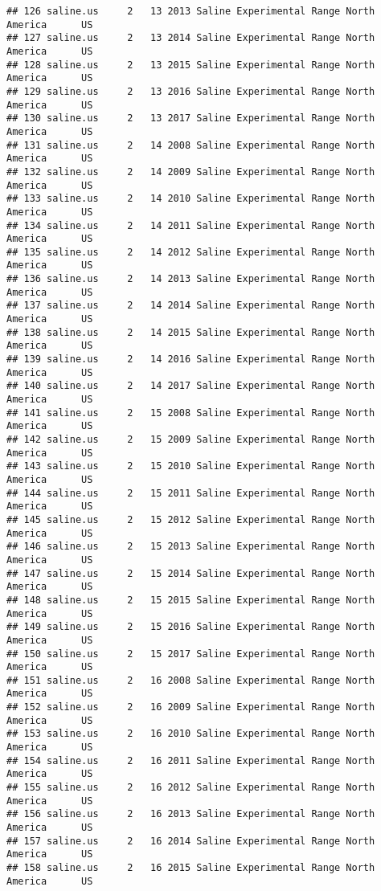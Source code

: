 \documentclass[]{article}
\begin{document}
\begin{verbatim}
## 126 saline.us     2   13 2013 Saline Experimental Range North America      US
## 127 saline.us     2   13 2014 Saline Experimental Range North America      US
## 128 saline.us     2   13 2015 Saline Experimental Range North America      US
## 129 saline.us     2   13 2016 Saline Experimental Range North America      US
## 130 saline.us     2   13 2017 Saline Experimental Range North America      US
## 131 saline.us     2   14 2008 Saline Experimental Range North America      US
## 132 saline.us     2   14 2009 Saline Experimental Range North America      US
## 133 saline.us     2   14 2010 Saline Experimental Range North America      US
## 134 saline.us     2   14 2011 Saline Experimental Range North America      US
## 135 saline.us     2   14 2012 Saline Experimental Range North America      US
## 136 saline.us     2   14 2013 Saline Experimental Range North America      US
## 137 saline.us     2   14 2014 Saline Experimental Range North America      US
## 138 saline.us     2   14 2015 Saline Experimental Range North America      US
## 139 saline.us     2   14 2016 Saline Experimental Range North America      US
## 140 saline.us     2   14 2017 Saline Experimental Range North America      US
## 141 saline.us     2   15 2008 Saline Experimental Range North America      US
## 142 saline.us     2   15 2009 Saline Experimental Range North America      US
## 143 saline.us     2   15 2010 Saline Experimental Range North America      US
## 144 saline.us     2   15 2011 Saline Experimental Range North America      US
## 145 saline.us     2   15 2012 Saline Experimental Range North America      US
## 146 saline.us     2   15 2013 Saline Experimental Range North America      US
## 147 saline.us     2   15 2014 Saline Experimental Range North America      US
## 148 saline.us     2   15 2015 Saline Experimental Range North America      US
## 149 saline.us     2   15 2016 Saline Experimental Range North America      US
## 150 saline.us     2   15 2017 Saline Experimental Range North America      US
## 151 saline.us     2   16 2008 Saline Experimental Range North America      US
## 152 saline.us     2   16 2009 Saline Experimental Range North America      US
## 153 saline.us     2   16 2010 Saline Experimental Range North America      US
## 154 saline.us     2   16 2011 Saline Experimental Range North America      US
## 155 saline.us     2   16 2012 Saline Experimental Range North America      US
## 156 saline.us     2   16 2013 Saline Experimental Range North America      US
## 157 saline.us     2   16 2014 Saline Experimental Range North America      US
## 158 saline.us     2   16 2015 Saline Experimental Range North America      US

\end{verbatim}
\end{document}
